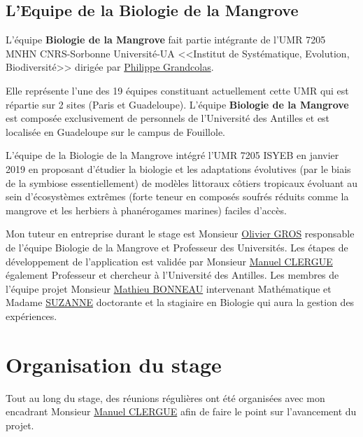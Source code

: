
        \subsection{L'Equipe de la Biologie de la Mangrove}
        L'équipe \textbf{Biologie de la Mangrove} fait partie intégrante de l'UMR 7205 MNHN CNRS-Sorbonne Université-UA <<Institut de Systématique, Evolution, Biodiversité>> dirigée par \underline{Philippe Grandcolas}.

        \vspace{0.5cm}

        \begin{flushleft}
            Elle représente l'une des 19 équipes constituant actuellement cette UMR qui est répartie sur 2 sites (Paris et Guadeloupe). L'équipe \textbf{Biologie de la Mangrove} est composée exclusivement de personnels de l'Université des Antilles et est localisée en Guadeloupe sur le campus de Fouillole.

            \vspace{0.5cm}
            
            L'équipe de la Biologie de la Mangrove intégré l'UMR 7205 ISYEB en janvier 2019 en proposant d'étudier la biologie et les adaptations évolutives (par le biais de la symbiose essentiellement) de modèles littoraux côtiers tropicaux évoluant au sein d'écosystèmes extrêmes (forte teneur en composés soufrés réduits comme la mangrove et les herbiers à phanérogames marines) faciles d'accès.
        
            \vspace{0.5cm}
        
            Mon tuteur en entreprise durant le stage est Monsieur \underline{Olivier GROS} responsable de l'équipe Biologie de la Mangrove et Professeur des Universités.
            Les étapes de développement de l'application est validée par Monsieur \underline{Manuel CLERGUE} également Professeur et chercheur à l'Université des Antilles.
            Les membres de l'équipe projet Monsieur \underline{Mathieu BONNEAU} intervenant Mathématique et Madame \underline{SUZANNE} doctorante et la stagiaire en Biologie qui aura la gestion des expériences.

        \end{flushleft}

    \section{Organisation du stage} 
    Tout au long du stage, des réunions régulières ont été organisées avec mon encadrant Monsieur \underline{Manuel CLERGUE} afin de faire le point sur l'avancement du projet.

